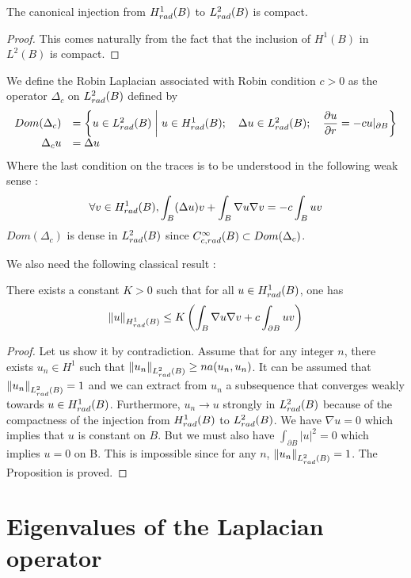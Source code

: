 \documentclass[11pt,a4paper]{article}
\begin{document}
\begin{Prop} The canonical injection from $H^1_{rad}(B)$ to $L^2_{rad}(B)$ is compact. 
\begin{proof}
This comes naturally from the fact that the inclusion of $H^1(B)$ in $L^2(B)$ is compact. 
\end{proof}
\end{Prop}

\begin{Def} We define the Robin Laplacian associated with Robin condition $c>0$ as the operator $\Delta_c$ on $L^2_{rad}(B)$ defined by 
\[\begin{array}{rl}
{Dom}(\Delta_c) &= \left\{u \in L^2_{rad}(B)\mathrel{}\middle|\mathrel{}u \in H^1_{rad}(B) ; \quad \Delta u \in L^2_{rad}(B) ;\quad  \dfrac{\partial u}{\partial r} = -c u|_{\partial B}\right\} \\
\Delta_c u & = \Delta u
\end{array}\]
Where the last condition on the traces is to be understood in the following weak sense : 
\[\forall v \in H^1_{rad}(B), \int_B (\Delta u) v + \int_B \nabla u \nabla v = -c \int_B uv\]
$Dom(\Delta_c)$ is dense in $L^2_{rad}(B)$ since $C^\infty_{c,rad}(B) \subset Dom(\Delta_c)$.
\end{Def}
We also need the following classical result : 
\begin{Prop} There exists a constant $K >0$ such that for all $u\in H^1_{rad}(B)$, one has \[\left\|u\right\|_{H^1_{rad}(B)} \leq K \left( \int_{B}\nabla u \nabla v + c\int_{\partial B} uv \right)\]
\begin{proof}
Let us show it by contradiction. Assume that for any integer $n$, there exists $u_n\in H^1$ such that 
$\left\|u_n\right\|_{L^2_{rad}(B)} \geq n a(u_n,u_n)$.  It can be assumed that $\left\|u_n\right\|_{L^2_{rad}(B)} = 1$ and we can extract from $u_n$ a subsequence that converges weakly towards $u \in H^1_{rad}(B)$. Furthermore, $u_n \to u$ strongly in $L^2_{rad}(B)$ because of the compactness of the injection from $H^1_{rad}(B)$ to $L^2_{rad}(B)$. We have $\nabla u =0$ which implies that $u$ is constant on $B$. But we must also have $\displaystyle\int_{\partial B} |u|^2 = 0$  which implies $u=0$ on B. This is impossible since for any $n$, $\left\|u_n\right\|_{L^2_{rad}(B)} = 1$. The Proposition is proved. 
\end{proof}
\end{Prop}


\section{Eigenvalues of the Laplacian operator}
\end{document}
